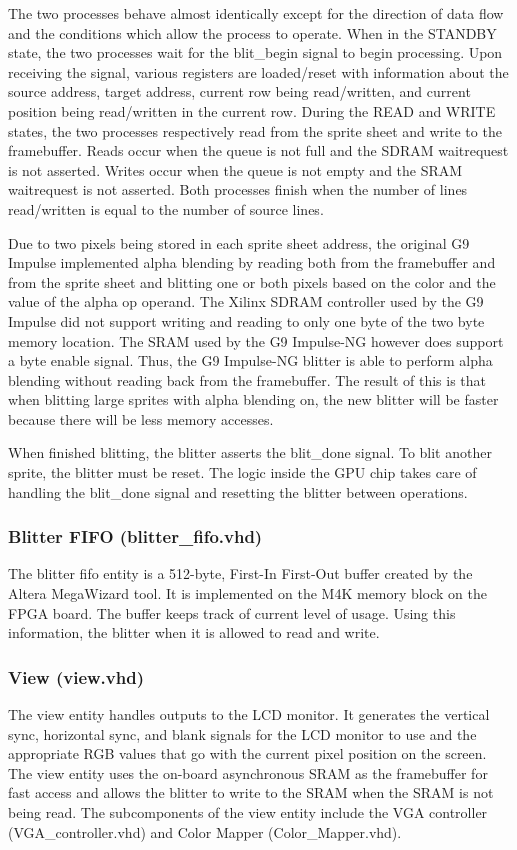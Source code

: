 \documentclass{report}
\begin{document}
The two processes behave almost identically except for the direction of data
flow and the conditions which allow the process to operate. When in the
STANDBY state, the two processes wait for the blit\_begin signal to
begin processing. Upon receiving the signal, various registers are
loaded/reset with information about the source address, target address,
current row being read/written, and current position being read/written
in the current row. During the READ and WRITE states, the two processes
respectively read from the sprite sheet and write to the framebuffer.
Reads occur when the queue is not full and the SDRAM waitrequest is not
asserted. Writes occur when the queue is not empty and the SRAM
waitrequest is not asserted. Both processes finish when the number of
lines read/written is equal to the number of source lines.

Due to two pixels being stored in each sprite sheet address, the
original G9 Impulse implemented alpha blending by reading both from the
framebuffer and from the sprite sheet and blitting one or both pixels
based on the color and the value of the alpha op operand. The Xilinx
SDRAM controller used by the G9 Impulse did not support writing and
reading to only one byte of the two byte memory location. The SRAM used by the G9
Impulse-NG however does support a byte enable signal. Thus, the G9
Impulse-NG blitter is able to perform alpha blending without reading
back from the framebuffer. The result of this is that when blitting large
sprites with alpha blending on, the new blitter will be faster because
there will be less memory accesses.

When finished blitting, the blitter asserts the blit\_done signal. To
blit another sprite, the blitter must be reset. The logic inside the
GPU chip takes care of handling the blit\_done signal and resetting the
blitter between operations.

\subsubsection{Blitter FIFO (blitter\_fifo.vhd)}
The blitter fifo entity is a 512-byte, First-In First-Out buffer created 
by the Altera MegaWizard tool. It is implemented on the M4K memory block 
on the FPGA board. The buffer keeps track of current level of usage. 
Using this information, the blitter when it is allowed to read and
write.

\subsubsection{View (view.vhd)}
The view entity handles outputs to the LCD monitor. It generates the 
vertical sync, horizontal sync, and blank signals for the LCD monitor to 
use and the appropriate RGB values that go with the current pixel 
position on the screen. The view entity uses the on-board asynchronous 
SRAM as the framebuffer for fast access and allows the blitter to write to the SRAM 
when the SRAM is not being read. The subcomponents of the view entity 
include the VGA controller (VGA\_controller.vhd) and Color Mapper 
(Color\_Mapper.vhd).
\end{document}
